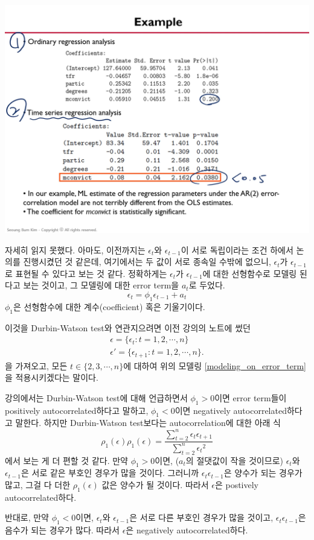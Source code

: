 \documentclass{article}
\begin{document}
\begin{center}
\includegraphics[width=.45\textwidth]{model_4-6}
\end{center}

자세히 읽지 못했다. 아마도, 이전까지는 \(\epsilon_t\)와 \(\epsilon_{t-1}\)이 서로 독립이라는 조건 하에서 논의를 진행시켰던 것 같은데, 여기에서는 두 값이 서로 종속일 수밖에 없으니, \(\epsilon_t\)가 \(\epsilon_{t-1}\)로 표현될 수 있다고 보는 것 같다.
정확하게는 \(\epsilon_t\)가 \(\epsilon_{t-1}\)에 대한 선형함수로 모델링 된다고 보는 것이고, 그 모델링에 대한 error term을 \(a_t\)로 두었다.
\begin{equation}\label{modeling_on_error_term}
\epsilon_t=\phi_1\epsilon_{t-1}+a_t
\end{equation}
\(\phi_1\)은 선형함수에 대한 계수(coefficient) 혹은 기울기이다.

이것을 Durbin-Watson test와 연관지으려면 이전 강의의 노트에 썼던
\begin{gather*}
\epsilon=\{\epsilon_t:t=1,2,\cdots,n\}\\
\epsilon'=\{\epsilon_{t+1}:t=1,2,\cdots,n\}.
\end{gather*}
을 가져오고, 모든 \(t\in\{2,3,\cdots,n\}\)에 대하여 위의 모델링 \eqref{modeling_on_error_term}을 적용시키겠다는 말이다.

강의에서는 Durbin-Watson test에 대해 언급하면서 \(\phi_1>0\)이면 error term들이 positively autocorrelated하다고 말하고, \(\phi_1<0\)이면 negatively autocorrelated하다고 말한다.
하지만 Durbin-Watson test보다는 autocorrelation에 대한 아래 식
\[\rho_1(\epsilon)\rho_1(\epsilon)=\frac{\sum_{t=2}^n\epsilon_t\epsilon_{t+1}}{\sum_{t=2}^n{\epsilon_t}^2}\]
에서 보는 게 더 편할 것 같다.
만약 \(\phi_1>0\)이면, (\(a_t\)의 절댓값이 작을 것이므로) \(\epsilon_t\)와 \(\epsilon_{t-1}\)은 서로 같은 부호인 경우가 많을 것이다.
그러니까 \(\epsilon_t\epsilon_{t-1}\)은 양수가 되는 경우가 많고, 그걸 다 더한 \(\rho_1(\epsilon)\) 값은 양수가 될 것이다.
따라서 \(\epsilon\)은 postively autocorrelated하다.

반대로, 만약 \(\phi_1<0\)이면, \(\epsilon_t\)와 \(\epsilon_{t-1}\)은 서로 다른 부호인 경우가 많을 것이고, \(\epsilon_t\epsilon_{t-1}\)은 음수가 되는 경우가 많다.
따라서 \(\epsilon\)은 negatively autocorrelated하다.
\end{document}
